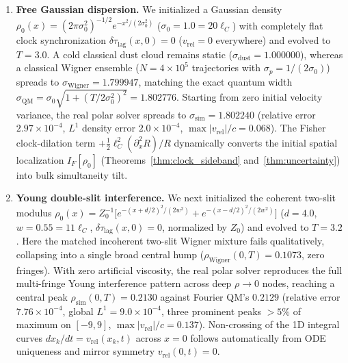 \documentclass[11pt, a4paper]{article}
\theoremstyle{definition}
\begin{document}
\begin{enumerate}[label=\textbf{Experiment \arabic*:}, leftmargin=2.5cm]
    \item \textbf{Free Gaussian dispersion.} We initialized a Gaussian density $\rho_0(x) = (2\pi\sigma_0^2)^{-1/2}e^{-x^2/(2\sigma_0^2)}$ ($\sigma_0 = 1.0 = 20\ell_C$) with completely flat clock synchronization $\delta\tau_{\text{lag}}(x,0) = 0$ ($v_{\text{rel}} = 0$ everywhere) and evolved to $T = 3.0$. A cold classical dust cloud remains static ($\sigma_{\text{dust}} = 1.000000$), whereas a classical Wigner ensemble ($N = 4 \times 10^5$ trajectories with $\sigma_p = 1/(2\sigma_0)$) spreads to $\sigma_{\text{Wigner}} = 1.799947$, matching the exact quantum width $\sigma_{\text{QM}} = \sigma_0\sqrt{1 + (T/2\sigma_0^2)^2} = 1.802776$. Starting from zero initial velocity variance, the real polar solver spreads to $\sigma_{\text{sim}} = 1.802240$ (relative error $2.97 \times 10^{-4}$, $L^1$ density error $2.0 \times 10^{-4}$, $\max|v_{\text{rel}}|/c = 0.068$). The Fisher clock-dilation term $+\frac{1}{2}\ell_C^2(\partial_x^2 R)/R$ dynamically converts the initial spatial localization $I_F[\rho_0]$ (Theorems~\ref{thm:clock_sideband} and~\ref{thm:uncertainty}) into bulk simultaneity tilt.

    \item \textbf{Young double-slit interference.} We next initialized the coherent two-slit modulus $\rho_0(x) = Z_0^{-1}\big[e^{-(x + d/2)^2/(2w^2)} + e^{-(x - d/2)^2/(2w^2)}\big]$ ($d = 4.0$, $w = 0.55 = 11\ell_C$, $\delta\tau_{\text{lag}}(x,0) = 0$, normalized by $Z_0$) and evolved to $T = 3.2$. Here the matched incoherent two-slit Wigner mixture fails qualitatively, collapsing into a single broad central hump ($\rho_{\text{Wigner}}(0, T) = 0.1073$, zero fringes). With zero artificial viscosity, the real polar solver reproduces the full multi-fringe Young interference pattern across deep $\rho \to 0$ nodes, reaching a central peak $\rho_{\text{sim}}(0, T) = 0.2130$ against Fourier QM's $0.2129$ (relative error $7.76 \times 10^{-4}$, global $L^1 = 9.0 \times 10^{-4}$, three prominent peaks $>5\%$ of maximum on $[-9, 9]$, $\max|v_{\text{rel}}|/c = 0.137$). Non-crossing of the 1D integral curves $dx_k/dt = v_{\text{rel}}(x_k, t)$ across $x = 0$ follows automatically from ODE uniqueness and mirror symmetry $v_{\text{rel}}(0, t) = 0$.


\end{enumerate}
\end{document}
